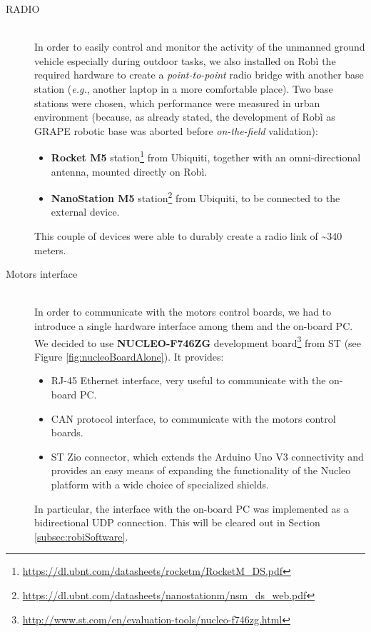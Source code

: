 \begin{description}
	\item[RADIO] \hfill \\ In order to easily control and monitor the activity of the unmanned ground vehicle especially during outdoor tasks, we also installed on Robì the required hardware to create a \textit{point-to-point} radio bridge with another base station (\textit{e.g.}, another laptop in a more comfortable place). Two base stations were chosen, which performance were measured in urban environment (because, as already stated, the development of Robì as \ac{GRAPE} robotic base was aborted before \textit{on-the-field} validation):
	\begin{itemize}
		\item \textbf{Rocket M5} station\footnote{\url{https://dl.ubnt.com/datasheets/rocketm/RocketM_DS.pdf}}
		from Ubiquiti, together with an omni-directional antenna, mounted directly on Robì.
		\item \textbf{NanoStation M5} station\footnote{\url{https://dl.ubnt.com/datasheets/nanostationm/nsm_ds_web.pdf}}
		from Ubiquiti, to be connected to the external device.
	\end{itemize}
	This couple of devices were able to durably create a radio link of \textasciitilde340 meters.
	
	\item[Motors interface] \hfill \\ In order to communicate with the motors control boards, we had to introduce a single hardware interface among them and the on-board PC. We decided to use \textbf{NUCLEO-F746ZG} development board\footnote{\url{http://www.st.com/en/evaluation-tools/nucleo-f746zg.html}}
	from ST (see Figure \ref{fig:nucleoBoardAlone}). It provides:
	\begin{itemize}
		\item RJ-45 Ethernet interface, very useful to communicate with the on-board PC.
		\item CAN protocol interface, to communicate with the motors control boards.
		\item ST Zio connector, which extends the Arduino Uno V3 connectivity and provides an easy means of expanding the functionality of the Nucleo platform with a wide choice of specialized shields.
	\end{itemize}
	In particular, the interface with the on-board PC was implemented as a bidirectional UDP connection. This will be cleared out in Section \ref{subsec:robiSoftware}.
	

\end{description}
